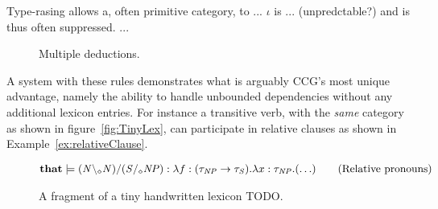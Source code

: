 Type-rasing allows a, often primitive category, to ... $\iota$ is ... (unpredctable?) and is thus often suppressed. ...  

\begin{figure}[ht]
\begin{minipage}[b]{0.5\linewidth}
\center
{}
\end{minipage}
\hfill
\begin{minipage}[b]{0.5\linewidth}
\center
{}
\end{minipage}
  \caption{Multiple deductions.}
  \label{fig:multipleDeductions}
\end{figure}

A system with these rules demonstrates what is arguably CCG's most unique advantage, namely the ability to handle unbounded dependencies without any additional lexicon entries. For instance a transitive verb, with the \emph{same} category as shown in figure~\ref{fig:TinyLex}, can participate in relative clauses as shown in Example~\ref{ex:relativeClause}.

\begin{figure}[ht]
\vspace{-1em}
\begin{align*}
  \mathbf{that}       &\models ({\mathit{N}} \backslash_\diamond {\mathit{N}})/({\mathit{S}}/_\diamond{\mathit{NP}})    : \lambda f : (\tau_{\mathit{NP}} \to \tau_{\mathit{S}}) . \lambda x : \tau_{\mathit{NP}} . (\ldots)    \tag{Relative pronouns}   
\end{align*}
\vspace{-1em}
\caption{A fragment of a tiny handwritten lexicon TODO.}
\label{fig:TinyLex2}
\end{figure}

